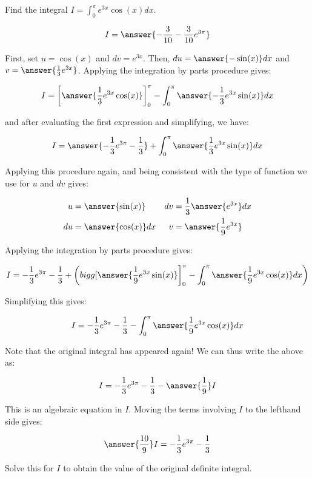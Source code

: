 \documentclass{ximera}
\author{Jim Talamo}
\begin{document}
\begin{exercise}
Find the integral $I = \int_0^{\pi} e^{3x}\cos(x) dx $.

\[
I = \answer{-\frac{3}{10}-\frac{3}{10}e^{3 \pi}}
\]

\begin{hint}
First, set $u = \cos(x)$ and $dv =  e^{3x}$.  Then, $du = \answer{- \sin(x)} dx$ and $v = \answer{\frac{1}{3}e^{3x}}$.  Applying the integration by parts procedure gives:

\[
I = \bigg[\answer{\frac{1}{3}e^{3x}\cos(x)}\bigg]_0^{\pi}-\int_0^{\pi} \answer{-\frac{1}{3}e^{3x}\sin(x)} dx
\] 

and after evaluating the first expression and simplifying, we have:

\[
I = \answer{-\frac{1}{3}e^{3\pi}-\frac{1}{3}}+\int_0^{\pi} \answer{\frac{1}{3}e^{3x}\sin(x)} dx
\]

\begin{question}
Applying this procedure again, and being consistent with the type of function we use for $u$ and $dv$ gives:

\begin{align*}
u  &=  \answer{\sin(x)} & dv &= \frac{1}{3} \answer{e^{3x}} dx \\
du &= \answer{\cos(x)} dx & v &= \answer{\frac{1}{9} e^{3x}}
\end{align*}

\begin{question}
Applying the integration by parts procedure gives:

\[
I = -\frac{1}{3}e^{3\pi}-\frac{1}{3}+\left(\\bigg[\answer{\frac{1}{9}e^{3x}\sin(x)}\bigg]_0^{\pi} - \int_0^{\pi} \answer{\frac{1}{9} e^{3x}\cos(x)} dx \right)
\] 

\begin{question}
Simplifying this gives:

\[
I = -\frac{1}{3}e^{3\pi}-\frac{1}{3}- \int_0^{\pi} \answer{\frac{1}{9} e^{3x}\cos(x)} dx 
\] 

Note that the original integral has appeared again!  We can thus write the above as:

\[
I = -\frac{1}{3}e^{3\pi}-\frac{1}{3}- \answer{\frac{1}{9}} I
\] 

This is an algebraic equation in $I$.  Moving the terms involving $I$ to the lefthand side gives:

\[
\answer{\frac{10}{9}} I = -\frac{1}{3}e^{3\pi}-\frac{1}{3}
\] 

Solve this for $I$ to obtain the value of the original definite integral.


\end{question}
\end{question}
\end{question}
\end{hint}

\end{exercise}
\end{document}
